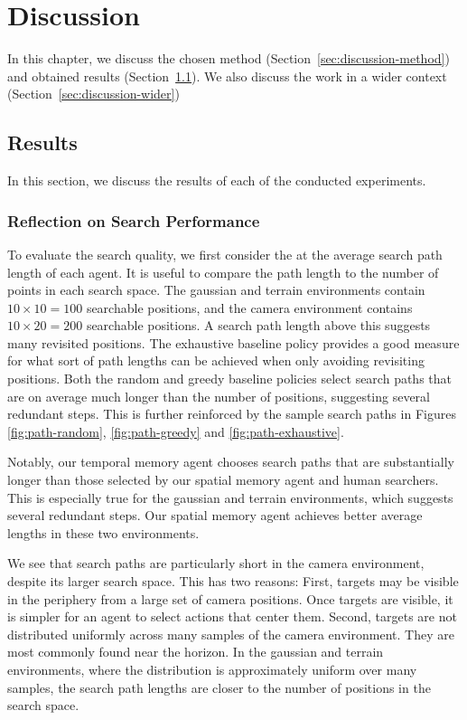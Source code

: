 \chapter{Discussion}
\label{cha:discussion}

In this chapter, we discuss the chosen method (Section~\ref{sec:discussion-method}) and obtained results (Section~\ref{sec:discussion-results}).
We also discuss the work in a wider context (Section~\ref{sec:discussion-wider})

\section{Results}
\label{sec:discussion-results}

In this section, we discuss the results of each of the conducted experiments.

\subsection{Reflection on Search Performance}

To evaluate the search quality, we first consider the at the average search path length of each agent.
It is useful to compare the path length to the number of points in each search space.
The gaussian and terrain environments contain \(10 \times 10 = 100\) searchable positions, and the camera environment contains \(10 \times 20 = 200\) searchable positions.
A search path length above this suggests many revisited positions.
The exhaustive baseline policy provides a good measure for what sort of path lengths can be achieved when only avoiding revisiting positions.
Both the random and greedy baseline policies select search paths that are on average much longer than the number of positions, suggesting several redundant steps.
This is further reinforced by the sample search paths in Figures \ref{fig:path-random}, \ref{fig:path-greedy} and \ref{fig:path-exhaustive}.

Notably, our temporal memory agent chooses search paths that are substantially longer than those selected by our spatial memory agent and human searchers.
This is especially true for the gaussian and terrain environments, which suggests several redundant steps.
Our spatial memory agent achieves better average lengths in these two environments.

We see that search paths are particularly short in the camera environment,
despite its larger search space.
This has two reasons:
First, targets may be visible in the periphery from a large set of camera positions.
Once targets are visible, it is simpler for an agent to select actions that center them.
Second, targets are not distributed uniformly across many samples of the camera environment.
They are most commonly found near the horizon.
In the gaussian and terrain environments, where the distribution is approximately uniform over many samples, the search path lengths are closer to the number of positions in the search space.

